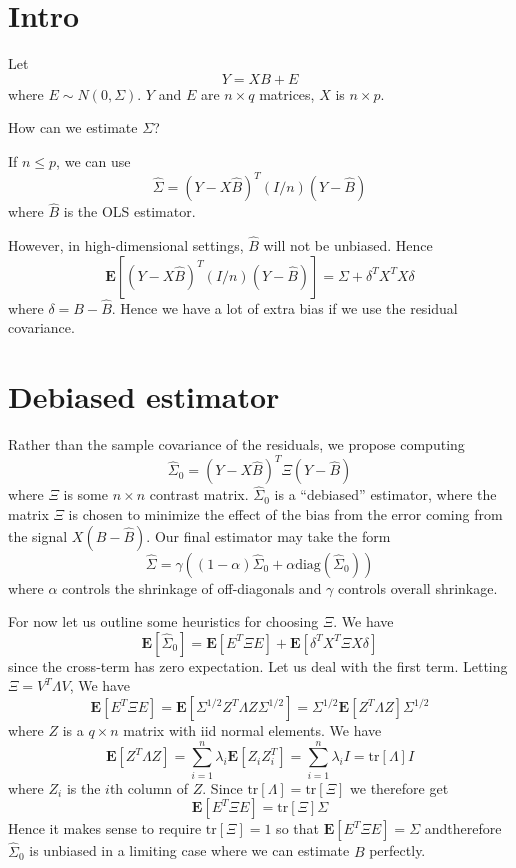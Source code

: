 \documentclass[12pt]{article}
\begin{document}
\maketitle

\newcommand{\tr}{\text{tr}}
\newcommand{\E}{\textbf{E}}
\newcommand{\diag}{\text{diag}}
\newcommand{\argmax}{\text{argmax}}
\newcommand{\Cov}{\text{Cov}}
\newcommand{\Var}{\text{Var}}
\newcommand{\argmin}{\text{argmin}}
\newcommand{\Vol}{\text{Vol}}
\newcommand{\comm}[1]{}

\section{Intro}

Let
\[Y = XB + E\]
where $E \sim N(0, \Sigma)$.
$Y$ and $E$ are $n \times q$ matrices, $X$ is $n \times p$.

How can we estimate $\Sigma$?

If $n \leq p$, we can use
\[
\hat{\Sigma} = (Y-X\hat{B})^T(I/n)(Y-\hat{B})
\]
where $\hat{B}$ is the OLS estimator.

However, in high-dimensional settings, $\hat{B}$ will not be unbiased.
Hence
\[
\E[(Y-X\hat{B})^T(I/n)(Y-\hat{B})] = \Sigma + \delta^T X^T X \delta
\]
where $\delta = B-\hat{B}$.
Hence we have a lot of extra bias if we use the residual covariance.

\section{Debiased estimator}

Rather than the sample covariance of the residuals, we propose computing
\[
\hat{\Sigma}_0 = (Y-X\hat{B})^T\Xi (Y-\hat{B})
\]
where $\Xi$ is some $n \times n$ contrast matrix.  $\hat{\Sigma}_0$ is
a ``debiased'' estimator, where the matrix $\Xi$ is chosen to minimize
the effect of the bias from the error coming from the signal $X(B
- \hat{B})$.
Our final estimator may take the form
\[
\hat{\Sigma} = \gamma((1-\alpha) \hat{\Sigma}_0 + \alpha \diag(\hat{\Sigma}_0))
\]
where $\alpha$ controls the shrinkage of off-diagonals and $\gamma$
controls overall shrinkage.

For now let us outline some heuristics for choosing $\Xi$.
We have
\[
\E[\hat{\Sigma}_0] = \E[E^T \Xi E] + \E[\delta^T X^T \Xi X \delta]
\]
since the cross-term has zero expectation.
Let us deal with the first term.
Letting $\Xi = V^T\Lambda V$, We have
\[
\E[E^T\Xi E] = \E[\Sigma^{1/2} Z^T \Lambda Z \Sigma^{1/2}] = \Sigma^{1/2}\E[Z^T \Lambda Z] \Sigma^{1/2}
\]
where $Z$ is a $q \times n$ matrix with iid normal elements.
We have
\[
\E[Z^T \Lambda Z] = \sum_{i=1}^n \lambda_i \E[Z_i Z_i^T] = \sum_{i=1}^n \lambda_i I = \tr[\Lambda] I
\]
where $Z_i$ is the $i$th column of $Z$.  Since $\tr[\Lambda] = \tr[\Xi]$ we therefore get
\[
\E[E^T \Xi E] = \tr[\Xi]\Sigma
\]
Hence it makes sense to require $\tr[\Xi]=1$ so that $\E[E^T\Xi E]
= \Sigma$ andtherefore $\hat{\Sigma}_0$ is unbiased in a limiting case
where we can estimate $B$ perfectly.
\end{document}
